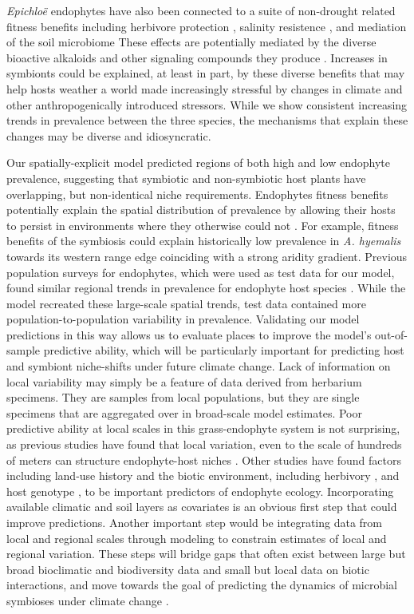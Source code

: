 \documentclass[11pt]{article}
\let\cite\citep
\begin{document}
\emph{Epichloë} endophytes have also been connected to a suite of non-drought related fitness benefits including herbivore protection \citep{brem2001epichloe}, salinity resistence \citep{wang2020effects}, and mediation of the soil microbiome \citep{roberts2015rhizosphere} 
These effects are potentially mediated by the diverse bioactive alkaloids and other signaling compounds they produce \citep{saikkonen2013chemical}.
Increases in symbionts could be explained, at least in part, by these diverse benefits that may help hosts weather a world made increasingly stressful by changes in climate and other anthropogenically introduced stressors.
While we show consistent increasing trends in prevalence between the three species, the mechanisms that explain these changes may be diverse and idiosyncratic. 

Our spatially-explicit model predicted regions of both high and low endophyte prevalence, suggesting that symbiotic and non-symbiotic host plants have overlapping, but non-identical niche requirements.
Endophytes fitness benefits potentially explain the spatial distribution of prevalence by allowing their hosts to persist in environments where they otherwise could not \citep{afkhami2014mutualist, kazenel2015mutualistic}.
For example, fitness benefits of the symbiosis could explain historically low prevalence in \emph{A. hyemalis} towards its western range edge coinciding with a strong aridity gradient.
Previous population surveys for endophytes, which were used as test data for our model, found similar regional trends in prevalence for endophyte host species \citep{sneck2017variation,rudgers2009benefits}. 
While the model recreated these large-scale spatial trends, test data contained more population-to-population variability in prevalence. 
Validating our model predictions in this way allows us to evaluate places to improve the model's out-of-sample predictive ability, which will be particularly important for predicting host and symbiont niche-shifts under future climate change.
Lack of information on local variability may simply be a feature of data derived from herbarium specimens. 
They are samples from local populations, but they are single specimens that are aggregated over in broad-scale model estimates.
Poor predictive ability at local scales in this grass-endophyte system is not surprising, as previous studies have found that local variation, even to the scale of hundreds of meters can structure endophyte-host niches \cite{kazenel2015mutualistic}. 
Other studies have found factors including land-use history \cite{vikuk2019infection} and the biotic environment, including herbivory \cite{rudgers2016long}, and host genotype \citet{sneck2017variation}, to be important predictors of endophyte ecology.
Incorporating available climatic and soil layers as covariates is an obvious first step that could improve predictions.
Another important step would be integrating data from local and regional scales  through modeling to constrain estimates of local and regional variation.
These steps will bridge gaps that often exist between large but broad bioclimatic and biodiversity data and small but local data on biotic interactions, and move towards the goal of predicting the dynamics of microbial symbioses under climate change \cite{miller2019recent, isaac2020data}.
\end{document}
